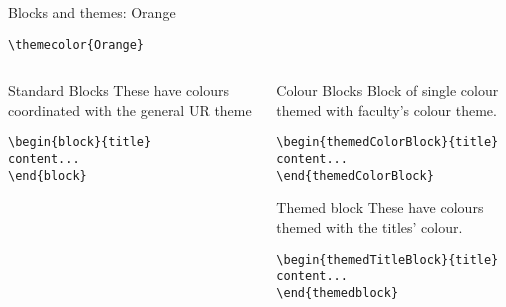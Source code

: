 \begingroup
{}
\begin{frame}[fragile]{Blocks and themes: Orange}
    \begin{center}\verb|\themecolor{Orange}|\end{center}
\begin{columns} %
\begin{column}{0.3\textwidth}
\begin{block}{Standard Blocks}
These have colours coordinated with the general UR theme
\begin{verbatim}
\begin{block}{title}
content...
\end{block}
\end{verbatim}
\end{block}
\end{column}
\begin{column}{0.7\textwidth}
\begin{themedColorBlock}{Colour Blocks}
Block of single colour themed with faculty's colour theme.
\small
\begin{verbatim}
\begin{themedColorBlock}{title}
content...
\end{themedColorBlock}
\end{verbatim}
\end{themedColorBlock}
\begin{themedTitleBlock} {Themed block}
These have colours themed with the titles' colour.
\small
\begin{verbatim}
\begin{themedTitleBlock}{title}
content...
\end{themedblock}
\end{verbatim}
\end{themedTitleBlock}
\end{column}
\end{columns}
\end{frame}
\endgroup


